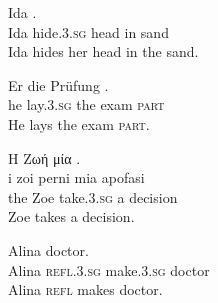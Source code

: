 \documentclass[output=paper,
modfonts,
]{langscibook}
\begin{document}


\ea \label{sl:skrivati-glavo-v-pesek}
\settowidth {} 
\gll Ida    . \\
Ida hide.\textsc{3.sg} head in sand \\ 
\glt Ida hides her head in the sand. 
\z

\ea \label{de:pruefung-ablegen}
\settowidth {} 
\gll Er  die Prüfung . \\
he lay.\textsc{3.sg} the exam \textsc{part} \\ 
\glt He lays the exam \textsc{part}. 
\z

\ea \label{el:take-decision}
\settowidth {} 
\glll Η Ζωή  μία .\\
i zoi perni mia apofasi \\
the Zoe take.\textsc{3.sg} a decision \\ 
\glt Zoe takes a decision. 
\z

\ea \label{ro:se-face}
\settowidth {} 
\gll Alina   doctor.\\
Alina \textsc{refl.3.sg} make.\textsc{3.sg} doctor \\ 
\glt Alina \textsc{refl} makes doctor. 
\z
\end{document}
